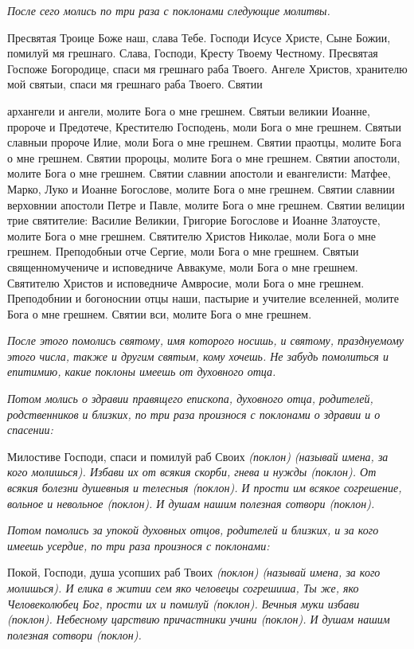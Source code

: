  \itshape После сего молись по три раза с поклонами следующие молитвы.\normalfont{}


   Пресвятая Троице Боже наш, слава Тебе. Господи Исусе Христе, Сыне
Божии, помилуй мя грешнаго. Слава, Господи, Кресту Твоему Честному.
Пресвятая Госпоже Богородице, спаси мя грешнаго раба Твоего. Ангеле
Христов, хранителю мой святыи, спаси мя грешнаго раба Твоего. Святии

архангели и ангели, молите Бога о мне грешнем. Святыи великии Иоанне,
пророче и Предотече, Крестителю Господень, моли Бога о мне грешнем.
Святыи славныи пророче Илие, моли Бога о мне грешнем. Святии праотцы,
молите Бога о мне грешнем. Святии пророцы, молите Бога о мне
грешнем. Святии апостоли, молите Бога о мне грешнем. Святии славнии
апостоли и евангелисти: Матфее, Марко, Луко и Иоанне Богослове,
молите Бога о мне грешнем. Святии славнии верховнии апостоли
Петре и Павле, молите Бога о мне грешнем. Святии велиции трие
святителие: Василие Великии, Григорие Богослове и Иоанне Златоусте,
молите Бога о мне грешнем. Святителю Христов Николае, моли Бога о
мне грешнем. Преподобныи отче Сергие, моли Бога о мне грешнем.
Святыи священномучениче и исповедниче Аввакуме, моли Бога о мне
грешнем. Святителю Христов и исповедниче Амвросие, моли Бога о мне
грешнем. Преподобнии и богоноснии отцы наши, пастырие и учителие
вселенней, молите Бога о мне грешнем. Святии вси, молите Бога о мне
грешнем.


 \itshape После этого помолись святому, имя которого носишь, и святому,
празднуемому этого числа, также и другим святым, кому хочешь. Не
забудь помолиться и епитимию, какие поклоны имеешь от духовного
отца.\normalfont{}


 \itshape Потом молись о здравии правящего епископа, духовного отца, родителей,
родственников и близких, по три раза произнося с поклонами о здравии и о
спасении: \normalfont{}


   Милостиве Господи, спаси и помилуй раб Своих \itshape (поклон) (называй имена,
за кого молишься)\normalfont{}. Избави их от всякия скорби, гнева и нужды \itshape (поклон)\normalfont{}. От
всякия болезни душевныя и телесныя \itshape (поклон)\normalfont{}. И прости им всякое
согрешение, вольное и невольное \itshape (поклон)\normalfont{}. И душам нашим полезная сотвори
\itshape (поклон)\normalfont{}.


 \itshape Потом помолись за упокой духовных отцов, родителей и близких, и за
кого имеешь усердие, по три раза произнося с поклонами:\normalfont{}


   Покой, Господи, душа усопших раб Твоих \itshape (поклон) (называй имена, за
кого молишься)\normalfont{}. И елика в житии сем яко человецы согрешиша, Ты же, яко
Человеколюбец Бог, прости их и помилуй \itshape (поклон)\normalfont{}. Вечныя муки избави
\itshape (поклон)\normalfont{}. Небесному царствию причастники учини \itshape (поклон)\normalfont{}. И душам нашим
полезная сотвори \itshape (поклон)\normalfont{}.



